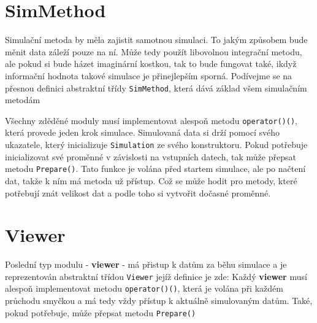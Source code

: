 \section{SimMethod}
Simulační metoda by měla zajistit samotnou simulaci. To jakým způsobem bude měnit data záleží pouze na ní. Může tedy použít libovolnou integrační metodu, ale pokud si bude házet imaginární kostkou, tak to bude fungovat také, ikdyž informační hodnota takové simulace je přinejlepším sporná. Podívejme se na přesnou definici abstraktní třídy \texttt{SimMethod}, která dává základ všem simulačním metodám

Všechny zděděné moduly musí implementovat alespoň metodu \texttt{operator()()}, která provede jeden krok simulace. Simulovaná data si drží pomocí svého ukazatele,
který inicializuje \texttt{Simulation} ze svého konstruktoru.
Pokud potřebuje inicializovat své proměnné v závislosti na vstupních datech, tak může přepsat metodu \texttt{Prepare()}. Tato funkce je volána před startem simulace, ale po načtení dat, takže k ním má metoda už přístup. Což se může hodit pro metody, které potřebují znát velikost dat a podle toho si vytvořit dočasné proměnné.
\section{Viewer}
Poslední typ modulu - \textbf{viewer} - má přistup k datům za běhu simulace a  je  reprezentován abstraktní třídou \texttt{Viewer} jejíž definice je zde:
Každý \textbf{viewer} musí alespoň implementovat metodu \texttt{operator()()}, která je volána při každém průchodu smyčkou a má tedy vždy přístup k aktuálně simulovaným datům. Také, pokud potřebuje, může přepsat metodu \texttt{Prepare()}
